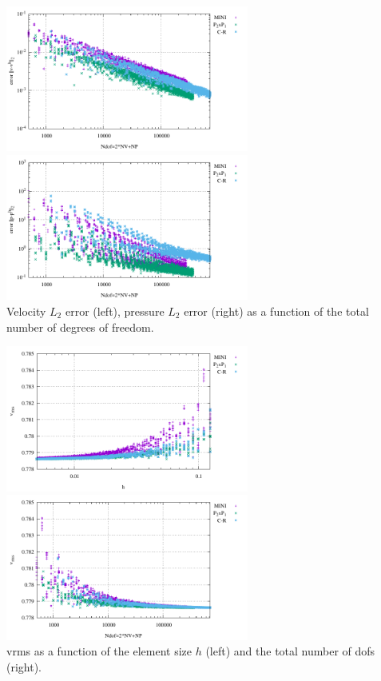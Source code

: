\begin{center}
\includegraphics[width=8cm]{python_codes/fieldstone_112/results/exp5_tridiag/errors_V_ndof.pdf}
\includegraphics[width=8cm]{python_codes/fieldstone_112/results/exp5_tridiag/errors_P_ndof.pdf}\\
{\captionfont Velocity $L_2$ error (left), pressure $L_2$ error (right) as a function of the total 
number of degrees of freedom.} 
\end{center}


\begin{center}
\includegraphics[width=8cm]{python_codes/fieldstone_112/results/exp5_tridiag/vrms.pdf}
\includegraphics[width=8cm]{python_codes/fieldstone_112/results/exp5_tridiag/vrms_ndof.pdf}\\
{\captionfont vrms as a function of the element size $h$ (left) and the total number of dofs (right).}
\end{center}

